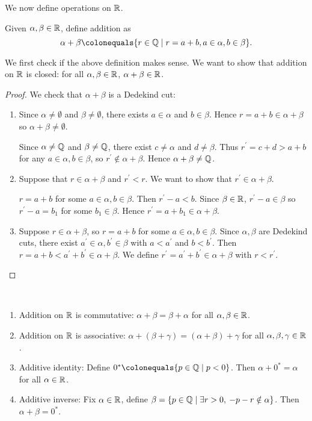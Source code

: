 We now define operations on $\mathbb R$.

\begin{definition}[Addition]
Given $\alpha,\beta\in\mathbb R$, define addition as
\[\alpha+\beta\colonequals\{r\in\QQ\mid r=a+b,a\in\alpha,b\in\beta\}.\]
\end{definition}

We first check if the above definition makes sense. We want to show that addition on $\mathbb R$ is closed: for all $\alpha,\beta\in\mathbb R$, $\alpha+\beta\in\mathbb R$.

\begin{proof}
We check that $\alpha+\beta$ is a Dedekind cut:
\begin{enumerate}[label=(\roman*)]
\item Since $\alpha\neq\emptyset$ and $\beta\neq\emptyset$, there exists $a\in\alpha$ and $b\in\beta$. Hence $r=a+b\in\alpha+\beta$ so $\alpha+\beta\neq\emptyset$.

Since $\alpha\neq\mathbb Q$ and $\beta\neq\mathbb Q$, there exist $c\neq\alpha$ and $d\neq\beta$. Thus $r^\prime=c+d>a+b$ for any $a\in\alpha,b\in\beta$, so $r^\prime\notin\alpha+\beta$. Hence $\alpha+\beta\neq\mathbb Q$.

\item Suppose that $r\in\alpha+\beta$ and $r^\prime<r$. We want to show that $r^\prime\in\alpha+\beta$.

$r=a+b$ for some $a\in\alpha,b\in\beta$. Then $r^\prime-a<b$. Since $\beta\in\mathbb R$, $r^\prime-a\in\beta$ so $r^\prime-a=b_1$ for some $b_1\in\beta$. Hence $r^\prime=a+b_1\in\alpha+\beta$.

\item Suppose $r\in\alpha+\beta$, so $r=a+b$ for some $a\in\alpha,b\in\beta$. Since $\alpha,\beta$ are Dedekind cuts, there exist $a^\prime\in\alpha,b^\prime\in\beta$ with $a<a^\prime$ and $b<b^\prime$. Then $r=a+b<a^\prime+b^\prime\in\alpha+\beta$. We define $r^\prime=a^\prime+b^\prime\in\alpha+\beta$ with $r<r^\prime$.
\end{enumerate}
\end{proof}

\begin{lemma} \
\begin{enumerate}[label=(\roman*)]
\item Addition on $\mathbb R$ is commutative: $\alpha+\beta=\beta+\alpha$ for all $\alpha,\beta\in\mathbb R$.
\item Addition on $\mathbb R$ is associative: $\alpha+(\beta+\gamma)=(\alpha+\beta)+\gamma$ for all $\alpha,\beta,\gamma\in\mathbb R$.
\item Additive identity: Define $0^*\colonequals\{p\in\QQ\mid p<0\}$. Then $\alpha+0^*=\alpha$ for all $\alpha\in\mathbb R$.
\item Additive inverse: Fix $\alpha\in\mathbb R$, define $\beta=\{p\in\mathbb Q\mid\exists r>0,\:-p-r\notin\alpha\}$. Then $\alpha+\beta=0^*$.
\end{enumerate}
\end{lemma}

